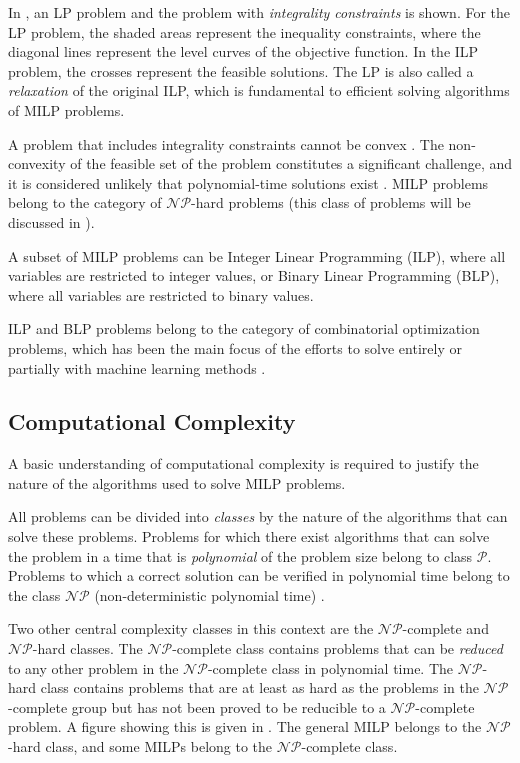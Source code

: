 In , an \gls{LP} problem and the problem with \textit{integrality constraints} is shown. For the \gls{LP} problem, the shaded areas represent the inequality constraints, where the diagonal lines represent the level curves of the objective function. In the \gls{ILP} problem, the crosses represent the feasible solutions. The \gls{LP} is also called a \textit{relaxation} of the original \gls{ILP}, which is fundamental to efficient solving algorithms of \gls{MILP} problems.

A problem that includes integrality constraints cannot be convex \cite{wolsey2020integer}. The non-convexity of the feasible set of the problem constitutes a significant challenge, and it is considered unlikely that polynomial-time solutions exist \cite{papadimitriou1982combinatorial}. \gls{MILP} problems belong to the category of $\mathcal{NP}$-hard problems \cite{papadimitriou1982combinatorial} (this class of problems will be discussed in ).   

A subset of \gls{MILP} problems can be Integer Linear Programming (\gls{ILP}), where all variables are restricted to integer values, or Binary Linear Programming (\gls{BLP}), where all variables are restricted to binary values. 

\gls{ILP} and \gls{BLP} problems belong to the category of combinatorial optimization problems, which has been the main focus of the efforts to solve entirely or partially with machine learning methods \cite{bengio2020machine}. 




\subsection{Computational Complexity}\label{ssec:complexity}

A basic understanding of computational complexity is required to justify the nature of the algorithms used to solve \gls{MILP} problems. 

All problems can be divided into \textit{classes} by the nature of the algorithms that can solve these problems. Problems for which there exist algorithms that can solve the problem in a time that is \textit{polynomial} of the problem size belong to class $\mathcal{P}$. Problems to which a correct solution can be verified in polynomial time belong to the class $\mathcal{NP}$ (non-deterministic polynomial time) \cite{cormen2009introduction}. 


Two other central complexity classes in this context are the $\mathcal{NP}$-complete and $\mathcal{NP}$-hard classes. The $\mathcal{NP}$-complete class contains problems that can be \textit{reduced} to any other problem in the $\mathcal{NP}$-complete class in polynomial time. 
The $\mathcal{NP}$-hard class contains problems that are at least as hard as the problems in the $\mathcal{NP}$-complete group but has not been proved to be reducible to a $\mathcal{NP}$-complete problem. A figure showing this is given in . The general \gls{MILP} belongs to the $\mathcal{NP}$-hard class, and some \gls{MILP}s belong to the $\mathcal{NP}$-complete class. 


